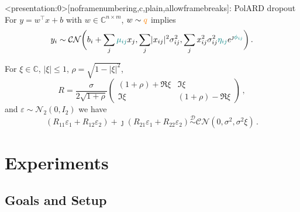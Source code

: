 \documentclass[handout]{beamer}
\newcommand{\cplx}{\mathbb{C}}
\newcommand{\iu}{{\jmath}}
\begin{document}
\begin{frame}<presentation:0>[noframenumbering,c,plain,allowframebreaks]{\insertsection: PolARD dropout}
  For $y = w^\top x + b$ with $w \in \cplx^{n \times m}$, $w \sim {\color{orange} q}$ implies
  \begin{equation*}
    y_i \sim \mathcal{CN}\biggl(
        b_i + \sum_j {\color{teal} \mu_{i j}} x_j,
        \sum_j \lvert x_{i j} \rvert^2 \sigma^2_{i j},
        \sum_j x_{i j}^2 \sigma^2_{i j}
        {\color{teal} \eta_{i j}} e^{\iu {\color{teal} \phi_{i j}}}
    \biggr)
    \,.
  \end{equation*}

  \pause
  \bigskip
  For $
    \xi \in \cplx
  $, $\lvert \xi \rvert \leq 1$, $
    \rho = \sqrt{1 - \lvert \xi \rvert^2}
  $,
  $$
    R = \frac\sigma{2 \sqrt{1 + \rho}} \begin{pmatrix}
        (1 + \rho) + \Re \xi & \Im \xi \\
        \Im \xi & (1 + \rho) - \Re \xi
      \end{pmatrix}
    \,, $$
  and $\varepsilon \sim \mathcal{N}_2(0, I_2)$ we have 
  $$
    (R_{11} \varepsilon_1 + R_{12} \varepsilon_2)
    + \iu (R_{21} \varepsilon_1 + R_{22} \varepsilon_2)
    \overset{\mathcal{D}}{\sim}
    \mathcal{CN}(0, \sigma^2, \sigma^2 \xi)
  \,. $$
\end{frame}



\section{Experiments} %
\label{sec:experiments}

\subsection{Goals and Setup} %
\label{sub:goals}
\end{document}
